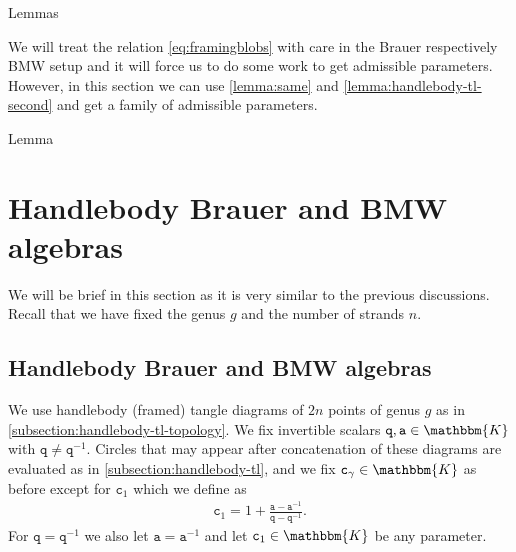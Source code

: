 \documentclass[a4paper,11pt]{amsart}
\newcommand{\KK}{\mathbbm{K}}
\newcommand{\varsym}[1]{\mathtt{#1}}
\newcommand{\qvar}{\varsym{q}}
\newcommand{\cvar}{\varsym{c}}
\newcommand{\avar}{\varsym{a}}
\numberwithin{equation}{section}
\let\fullref\autoref
\def\makeautorefname#1#2{\expandafter\def\csname#1autorefname\endcsname{#2}}
\begin{document}
\makeautorefname{lemma}{Lemmas}

\begin{remark}
We will treat the relation \eqref{eq:framingblobs} 
with care in the Brauer respectively BMW setup 
and it will force us to do 
some work to get admissible parameters. However, in this section 
we can use \fullref{lemma:same} and \ref{lemma:handlebody-tl-second} 
and get a family of admissible parameters.
\end{remark}

\makeautorefname{lemma}{Lemma}

\section{Handlebody Brauer and BMW algebras}\label{section:brauer}

We will be brief in this section as it is very similar 
to the previous discussions. Recall that we have fixed the genus $g$ and 
the number of strands $n$.

\subsection{Handlebody Brauer and BMW algebras}\label{subsection:BMW}

We use handlebody 
(framed) tangle diagrams of $2n$ 
points of genus $g$ as in \fullref{subsection:handlebody-tl-topology}.
We fix invertible scalars 
$\qvar,\avar\in\KK$ with $\qvar\neq\qvar^{-1}$.
Circles that may appear after concatenation of these diagrams 
are evaluated as in \fullref{subsection:handlebody-tl}, and we 
fix $\cvar_{\gamma}\in\KK$ as before except for 
$\cvar_{1}$ which we define as
\begin{gather*}
\cvar_{1}=1+\tfrac{\avar-\avar^{-1}}{\qvar-\qvar^{-1}}.
\end{gather*}
For $\qvar=\qvar^{-1}$ we also let $\avar=\avar^{-1}$
and let $\cvar_{1}\in\KK$ be any parameter.
\end{document}

